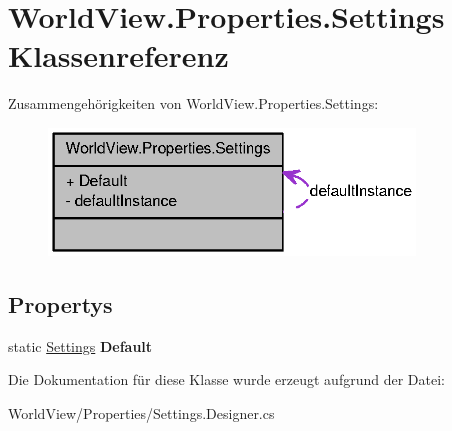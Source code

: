 \hypertarget{class_world_view_1_1_properties_1_1_settings}{
\section{WorldView.Properties.Settings Klassenreferenz}
\label{class_world_view_1_1_properties_1_1_settings}
}


Zusammengehörigkeiten von WorldView.Properties.Settings:\nopagebreak
\begin{figure}[H]
\begin{center}
\leavevmode
\includegraphics[width=276pt]{class_world_view_1_1_properties_1_1_settings__coll__graph}
\end{center}
\end{figure}
\subsection*{Propertys}
\begin{DoxyCompactItemize}
\item 
\hypertarget{class_world_view_1_1_properties_1_1_settings_a8a1317386bca1480adaf1bf61028e00b}{
static \hyperlink{class_world_view_1_1_properties_1_1_settings}{Settings} {\bfseries Default}}
\label{class_world_view_1_1_properties_1_1_settings_a8a1317386bca1480adaf1bf61028e00b}

\end{DoxyCompactItemize}


Die Dokumentation für diese Klasse wurde erzeugt aufgrund der Datei:\begin{DoxyCompactItemize}
\item 
WorldView/Properties/Settings.Designer.cs\end{DoxyCompactItemize}
